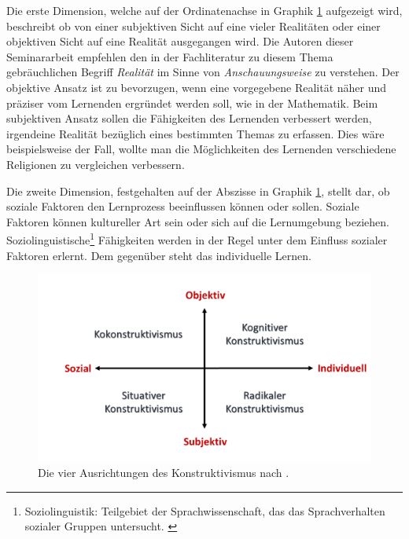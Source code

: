 Die erste Dimension, welche auf der Ordinatenachse in Graphik \ref{fig:Anderson.1999_4positions} aufgezeigt wird, beschreibt ob von einer subjektiven Sicht auf eine vieler Realitäten oder einer objektiven Sicht auf eine Realität ausgegangen wird. Die Autoren dieser Seminararbeit empfehlen den in der Fachliteratur zu diesem Thema gebräuchlichen Begriff \emph{Realität} im Sinne von \emph{Anschauungsweise} zu verstehen. %
Der objektive Ansatz ist zu bevorzugen, wenn eine vorgegebene Realität näher und präziser vom Lernenden ergründet werden soll, wie in der Mathematik. Beim subjektiven Ansatz sollen die Fähigkeiten des Lernenden verbessert werden, irgendeine Realität bezüglich eines bestimmten Themas zu erfassen. Dies wäre beispielsweise der Fall, wollte man die Möglichkeiten des Lernenden verschiedene Religionen zu vergleichen verbessern. \cite{Anderson.1999}

Die zweite Dimension, festgehalten auf der Abszisse in Graphik \ref{fig:Anderson.1999_4positions}, stellt dar, ob soziale Faktoren den Lernprozess beeinflussen können oder sollen. Soziale Faktoren können kultureller Art sein oder sich auf die Lernumgebung beziehen. Soziolinguistische\footnote{Soziolinguistik: Teilgebiet der Sprachwissenschaft, das das Sprachverhalten sozialer Gruppen untersucht. \cite{Duden.2006}} Fähigkeiten werden in der Regel unter dem Einfluss sozialer Faktoren erlernt. Dem gegenüber steht das individuelle Lernen. \cite{Anderson.1999} %

\begin{figure}
	\centering
	\includegraphics[width=1\textwidth]{Abbildungen/Anderson_1999_4positions.png}
	\caption{Die vier Ausrichtungen des Konstruktivismus nach \cite{Anderson.1999}.}
	\label{fig:Anderson.1999_4positions}
\end{figure} %

